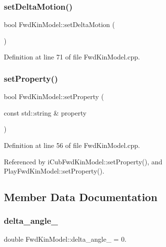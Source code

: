 \subsubsection{\texorpdfstring{set\+Delta\+Motion()}{setDeltaMotion()}}
{\footnotesize\ttfamily bool Fwd\+Kin\+Model\+::set\+Delta\+Motion (\begin{DoxyParamCaption}{ }\end{DoxyParamCaption})\hspace{0.3cm}{\ttfamily [protected]}}



Definition at line 71 of file Fwd\+Kin\+Model.\+cpp.

\mbox{\label{classFwdKinModel_ae5515e8bb1ebc936f67851a796b75fe1}} 
\subsubsection{\texorpdfstring{set\+Property()}{setProperty()}}
{\footnotesize\ttfamily bool Fwd\+Kin\+Model\+::set\+Property (\begin{DoxyParamCaption}\item[{const std\+::string \&}]{property }\end{DoxyParamCaption})\hspace{0.3cm}{\ttfamily [override]}}



Definition at line 56 of file Fwd\+Kin\+Model.\+cpp.



Referenced by i\+Cub\+Fwd\+Kin\+Model\+::set\+Property(), and Play\+Fwd\+Kin\+Model\+::set\+Property().



\subsection{Member Data Documentation}
\mbox{\label{classFwdKinModel_a17b3e7f99cfdfdc9890ff81d1a162e7e}} 
\subsubsection{\texorpdfstring{delta\+\_\+angle\+\_\+}{delta\_angle\_}}
{\footnotesize\ttfamily double Fwd\+Kin\+Model\+::delta\+\_\+angle\+\_\+ = 0.\hspace{0.3cm}{\ttfamily [private]}}



